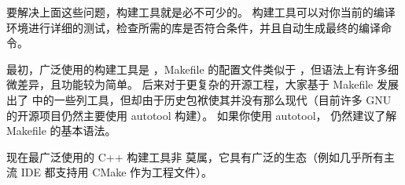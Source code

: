 要解决上面这些问题，构建工具就是必不可少的。 构建工具可以对你当前的编译环境进行详细的测试，检查所需的库是否符合条件，并且自动生成最终的编译命令。

最初，广泛使用的构建工具是 ，Makefile 的配置文件类似于 ，但语法上有许多细微差异，且功能较为简单。 后来对于更复杂的开源工程，大家基于 Makefile 发展出了  中的一些列工具，但却由于历史包袱使其并没有那么现代（目前许多 GNU 的开源项目仍然主要使用 autotool 构建）。 如果你使用 autotool， 仍然建议了解 Makefile 的基本语法。

现在最广泛使用的 C++ 构建工具非  莫属，它具有广泛的生态（例如几乎所有主流 IDE 都支持用 CMake 作为工程文件）。
